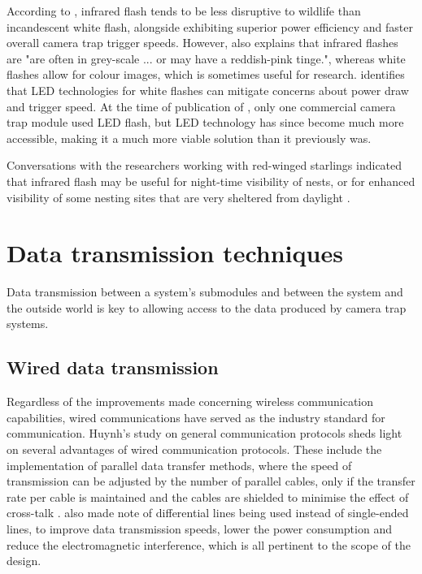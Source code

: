 \documentclass[class=report,11pt,crop=false]{standalone}
\begin{document}
According to \cite{meek2012introduction}, infrared flash tends to be less disruptive to wildlife than incandescent white flash, alongside exhibiting superior power efficiency and faster overall camera trap trigger speeds. However, \cite{meek2012introduction} also explains that infrared flashes are "are often in grey-scale ... or may have a reddish-pink tinge.", whereas white flashes allow for colour images, which is sometimes useful for research. \cite{meek2012introduction} identifies that LED technologies for white flashes can mitigate concerns about power draw and trigger speed. At the time of publication of \cite{meek2012introduction}, only one commercial camera trap module used LED flash, but LED technology has since become much more accessible, making it a much more viable solution than it previously was.

Conversations with the researchers working with red-winged starlings indicated that infrared flash may be useful for night-time visibility of nests, or for enhanced visibility of some nesting sites that are very sheltered from daylight \cite{hofmeyer2024private}.


\section{Data transmission techniques}

Data transmission between a system's submodules and between the system and the outside world is key to allowing access to the data produced by camera trap systems.

\subsection{Wired data transmission}

Regardless of the improvements made concerning wireless communication capabilities, wired communications have served as the industry standard for communication. Huynh’s study on general communication protocols \cite{huynh2010study} sheds light on several advantages of wired communication protocols. These include the implementation of parallel data transfer methods, where the speed of transmission can be adjusted by the number of parallel cables, only if the transfer rate per cable is maintained and the cables are shielded to minimise the effect of cross-talk \cite{huynh2010study}. \cite{huynh2010study} also made note of differential lines being used instead of single-ended lines, to improve data transmission speeds, lower the power consumption and reduce the electromagnetic interference, which is all pertinent to the scope of the design.
\end{document}
